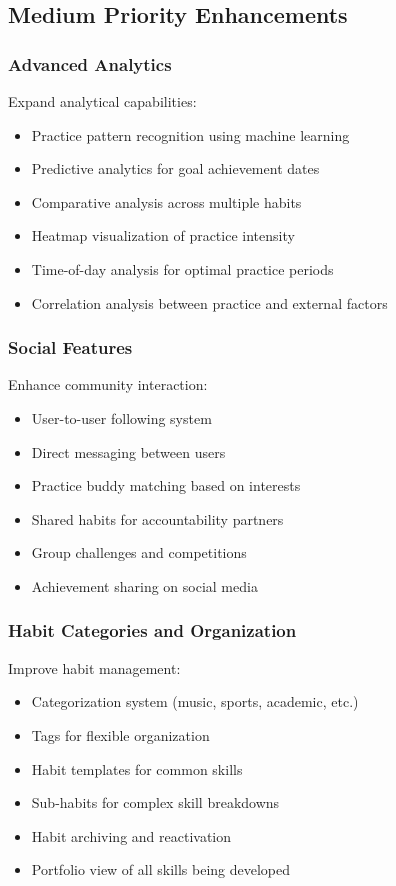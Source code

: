 \documentclass[12pt,a4paper]{report}
\newcommand{\JustifiedNormal}{\fontsize{12}{14}\selectfont\justifying\setlength{\parindent}{0pt}}
\begin{document}
\subsection{Medium Priority Enhancements}
\JustifiedNormal

\subsubsection{Advanced Analytics}
\JustifiedNormal
Expand analytical capabilities:
\begin{itemize}
  \item Practice pattern recognition using machine learning
  \item Predictive analytics for goal achievement dates
  \item Comparative analysis across multiple habits
  \item Heatmap visualization of practice intensity
  \item Time-of-day analysis for optimal practice periods
  \item Correlation analysis between practice and external factors
\end{itemize}

\subsubsection{Social Features}
\JustifiedNormal
Enhance community interaction:
\begin{itemize}
  \item User-to-user following system
  \item Direct messaging between users
  \item Practice buddy matching based on interests
  \item Shared habits for accountability partners
  \item Group challenges and competitions
  \item Achievement sharing on social media
\end{itemize}

\subsubsection{Habit Categories and Organization}
\JustifiedNormal
Improve habit management:
\begin{itemize}
  \item Categorization system (music, sports, academic, etc.)
  \item Tags for flexible organization
  \item Habit templates for common skills
  \item Sub-habits for complex skill breakdowns
  \item Habit archiving and reactivation
  \item Portfolio view of all skills being developed
\end{itemize}
\end{document}
